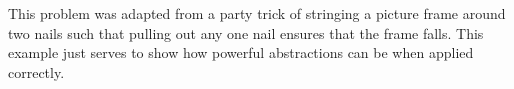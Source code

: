 \documentclass[12pt, titlepage]{article}
\theoremstyle{definition}
\begin{document}
This problem was adapted from a party trick of stringing a picture frame around two nails such that pulling out any one nail ensures that the frame falls. This example just serves to show how powerful abstractions can be when applied correctly.

\newpage



\end{document}
